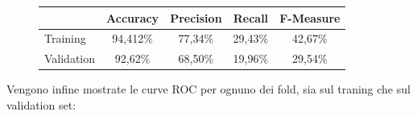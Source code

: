 \begin{figure}[H]
	\centering
	\begin{tabular}{lcccc}
		\toprule
		& \textbf{Accuracy} & \textbf{Precision} & \textbf{Recall} & 
		\textbf{F-Measure}  \\
		\midrule
		Training	&  94,412\% & 77,34\% & 29,43\%	& 42,67\%  	\\ 
		Validation	&  92,62\% & 68,50\% & 19,96\%	& 29,54\%	\\ 
		\bottomrule
	\end{tabular}
	\label{tab:svm_cv_performance}
\end{figure}

Vengono infine mostrate le curve ROC per ognuno dei fold, sia sul traning che 
sul validation set:



